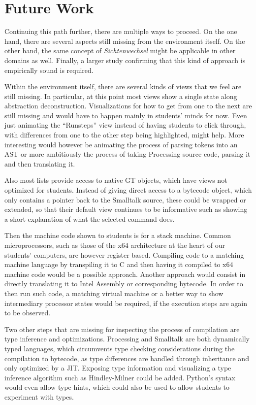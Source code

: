 \section{Future Work} \label{sc_future}

Continuing this path further, there are multiple ways to proceed. On the one hand, there are several aspects still missing from the environment itself. On the other hand, the same concept of \emph{Sichtenwechsel} might be applicable in other domains as well. Finally, a larger study confirming that this kind of approach is empirically sound is required.

Within the environment itself, there are several kinds of views that we feel are still missing. In particular, at this point most views show a single state along abstraction deconstruction. Visualizations for how to get from one to the next are still missing and would have to happen mainly in students' minds for now. Even just animating the ``Runsteps'' view instead of having students to click through, with differences from one to the other step being highlighted, might help. More interesting would however be animating the process of parsing tokens into an \ac{AST} or more ambitiously the process of taking Processing source code, parsing it and then translating it.

Also most lists provide access to native \ac{GT} objects, which have views not optimized for students. Instead of \eg giving direct access to a bytecode object, which only contains a pointer back to the Smalltalk source, these could be wrapped or extended, so that their default view continues to be informative such as showing a short explanation of what the selected command does.

Then the machine code shown to students is for a stack machine. Common microprocessors, such as those of the x64 architecture at the heart of our students' computers, are however register based. Compiling code to a matching machine language by \eg transpiling it to C and then having it compiled to x64 machine code would be a possible approach. Another approach would consist in directly translating it to Intel Assembly or corresponding bytecode. In order to then run such code, a matching virtual machine or a better way to show intermediary processor states would be required, if the execution steps are again to be observed.

Two other steps that are missing for inspecting the process of compilation are type inference and optimizations. Processing and Smalltalk are both dynamically typed languages, which circumvents type checking considerations during the compilation to bytecode, as type differences are handled through inheritance and only optimized by a \ac{JIT}. Exposing type information and visualizing a type inference algorithm such as Hindley-Milner could be added. Python's syntax would even allow type hints, which could also be used to allow students to experiment with types.

